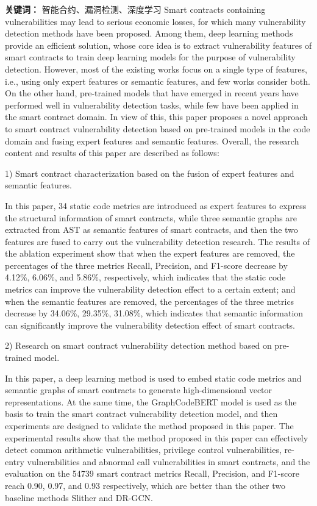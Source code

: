     {\noindent \textbf{关键词：} 智能合约、漏洞检测、深度学习}
\cleardoublepage
{}
Smart contracts containing vulnerabilities may lead to serious economic losses, for which many vulnerability detection methods have been proposed. Among them, deep learning methods provide an efficient solution, whose core idea is to extract vulnerability features of smart contracts to train deep learning models for the purpose of vulnerability detection. However, most of the existing works focus on a single type of features, i.e., using only expert features or semantic features, and few works consider both. On the other hand, pre-trained models that have emerged in recent years have performed well in vulnerability detection tasks, while few have been applied in the smart contract domain. In view of this, this paper proposes a novel approach to smart contract vulnerability detection based on pre-trained models in the code domain and fusing expert features and semantic features. Overall, the research content and results of this paper are described as follows:

    1) Smart contract characterization based on the fusion of expert features and semantic features.

    In this paper, 34 static code metrics are introduced as expert features to express the structural information of smart contracts, while three semantic graphs are extracted from AST as semantic features of smart contracts, and then the two features are fused to carry out the vulnerability detection research. The results of the ablation experiment show that when the expert features are removed, the percentages of the three metrics Recall, Precision, and F1-score decrease by 4.12\%, 6.06\%, and 5.86\%, respectively, which indicates that the static code metrics can improve the vulnerability detection effect to a certain extent; and when the semantic features are removed, the percentages of the three metrics decrease by 34.06\%, 29.35\%, 31.08\%, which indicates that semantic information can significantly improve the vulnerability detection effect of smart contracts.

    2) Research on smart contract vulnerability detection method based on pre-trained model.
    
    In this paper, a deep learning method is used to embed static code metrics and semantic graphs of smart contracts to generate high-dimensional vector representations. At the same time, the GraphCodeBERT model is used as the basis to train the smart contract vulnerability detection model, and then experiments are designed to validate the method proposed in this paper. The experimental results show that the method proposed in this paper can effectively detect common arithmetic vulnerabilities, privilege control vulnerabilities, re-entry vulnerabilities and abnormal call vulnerabilities in smart contracts, and the evaluation on the \num{54739} smart contract metrics Recall, Precision, and F1-score reach 0.90, 0.97, and 0.93 respectively, which are better than the other two baseline methods Slither and DR-GCN.
    
